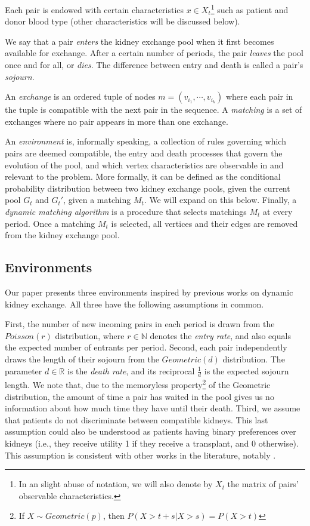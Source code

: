 Each pair is endowed with certain characteristics $x \in X_t$\footnote{In an slight abuse of notation, we will also denote by $X_t$ the matrix of pairs' observable characteristics.} such as patient and donor blood type (other characteristics will be discussed below). 

We say that a pair \emph{enters} the kidney exchange pool when it first becomes available for exchange. After a certain number of periods, the pair \emph{leaves} the pool once and for all, or \emph{dies}. The difference between entry and death is called a pair's \emph{sojourn}.

An \emph{exchange} is an ordered tuple of nodes $m = (v_{i_1}, \cdots, v_{i_{k}})$ where each pair in the tuple is compatible with the next pair in the sequence. A \emph{matching} is a set of exchanges where no pair appears in more than one exchange. 

An \emph{environment} is, informally speaking, a collection of rules governing which pairs are deemed compatible, the entry and death processes that govern the evolution of the pool, and which vertex characteristics are observable in and relevant to the problem. More formally, it can be defined as the conditional probability distribution between two kidney exchange pools, given the current pool $G_t$ and $G_t'$, given a matching $M_t$. We will expand on this below. Finally, a \emph{dynamic matching algorithm} is a procedure that selects matchings $M_t$ at every period. Once a matching $M_t$ is selected, all vertices and their edges are removed from the kidney exchange pool.


\subsection{Environments}

Our paper presents three environments inspired by previous works on dynamic kidney exchange. All three have the following assumptions in common. 

First, the number of new incoming pairs in each period is drawn from the $Poisson(r)$ distribution, where $r \in \mathbb{N}$ denotes the \emph{entry rate}, and also equals the expected number of entrants per period. Second, each pair independently draws the length of their sojourn from the $Geometric(d)$ distribution. The parameter $d \in \mathbb{R}$ is the \emph{death rate}, and its reciprocal $\frac{1}{d}$ is the expected sojourn length. We note that, due to the memoryless property\footnote{If $X \sim Geometric(p)$, then $P(X > t+s | X > s) = P(X > t)$} of the Geometric distribution, the amount of time a pair has waited in the pool gives us no information about how much time they have until their death. Third, we assume that patients do not discriminate between compatible kidneys. This last assumption could also be understood as patients having binary preferences over kidneys (i.e., they receive utility 1 if they receive a transplant, and 0 otherwise). This assumption is consistent with other works in the literature, notably \cite{roth2005pairwise}.

